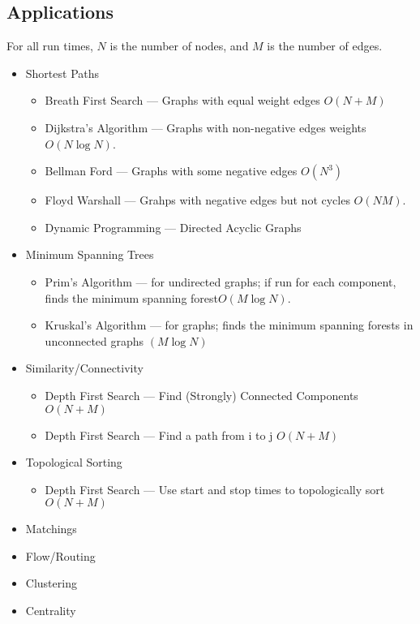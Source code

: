\subsection{Applications}
For all run times, $N$ is the number of nodes, and $M$ is the number of edges.
\begin{itemize}
    \item Shortest Paths
        \begin{itemize}
            \item Breath First Search --- Graphs with equal weight edges $O(N+M)$
            \item Dijkstra's Algorithm --- Graphs with non-negative edges weights $O(N \log N)$.
            \item Bellman Ford --- Graphs with some negative edges $O(N^3)$
            \item Floyd Warshall --- Grahps with negative edges but not cycles $O(NM)$.
            \item Dynamic Programming --- Directed Acyclic Graphs
		\end{itemize}
	\item Minimum Spanning Trees 
		\begin{itemize}
			\item Prim's Algorithm --- for undirected graphs; if run for each component, finds the minimum spanning forest$O(M \log N)$.
			\item Kruskal's Algorithm --- for graphs; finds the minimum spanning forests in unconnected graphs $(M \log N)$
		\end{itemize}
	\item Similarity/Connectivity
		\begin{itemize}
			\item Depth First Search --- Find (Strongly) Connected Components $O(N+M)$
			\item Depth First Search --- Find a path from i to j $O(N+M)$
        \end{itemize}
    \item Topological Sorting 
        \begin{itemize}
            \item Depth First Search --- Use start and stop times to topologically sort $O(N+M)$
        \end{itemize}
    \item Matchings
    \item Flow/Routing
    \item Clustering
    \item Centrality
\end{itemize}


